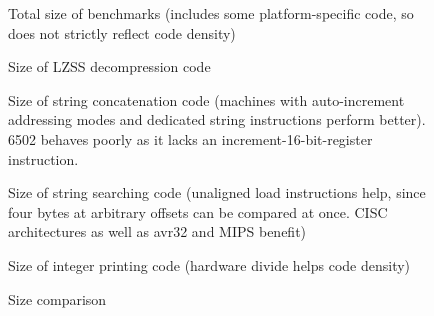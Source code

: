 \documentclass{article}[10pt]
\begin{document}
\noindent




\begin{figure}[tbp]
\begin{center}
\end{center}
\caption{Total size of benchmarks 
(includes some platform-specific code, so does not
strictly reflect code density)}
\label{figure:total}
\end{figure}

\begin{figure}[tbp]
\begin{center}
\end{center}
\caption{Size of LZSS decompression code}
\label{figure:decomp}
\end{figure}

\begin{figure}[tbp]
\begin{center}
\end{center}
\caption{Size of string concatenation code (machines with 
auto-increment addressing modes and dedicated
string instructions perform better). 6502 behaves poorly as it
lacks an increment-16-bit-register instruction.}
\label{figure:strcat}
\end{figure}

\begin{figure}[tbp]
\begin{center}
\end{center}
\caption{Size of string searching code (unaligned load
instructions help, since four bytes at arbitrary offsets 
can be compared at once.  CISC architectures as well as avr32 and MIPS
benefit)
}
\label{figure:findstring}
\end{figure}

\begin{figure}[tbp]
\begin{center}
\end{center}
\caption{Size of integer printing code (hardware
divide helps code density)}
\label{figure:numascii}
\end{figure}

\begin{figure}[tbp]
\begin{center}
\end{center}
\caption{Size comparison}
\label{figure:libc}
\end{figure}

{


}
\end{document}
